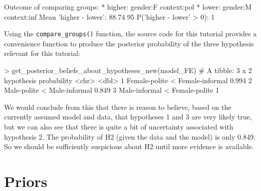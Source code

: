 \documentclass[nobib]{tufte-handout}
\begin{document}
\medskip

\begin{minipage}[]{\textwidth}
\begin{rc}
Outcome of comparing groups:
 * higher:  gender:F context:pol 
 * lower:   gender:M context:inf 
Mean 'higher - lower':  88.74 
95%
P('higher - lower' > 0):  1 
\end{rc}
\end{minipage}

Using the \texttt{compare\_groups()} function, the source code for this tutorial provides a
convenience function to produce the posterior probability of the three hypothesis relevant for
this tutorial:

\medskip

\begin{minipage}[]{\textwidth}
\begin{rc}
> get_posterior_beliefs_about_hypotheses_new(model_FE)
# A tibble: 3 x 2
  hypothesis                      probability
  <chr>                                 <dbl>
1 Female-polite < Female-informal       0.994
2 Male-polite < Male-informal           0.849
3 Male-informal < Female-polite         1
\end{rc}
\end{minipage}

We would conclude from this that there is reason to believe, based on the currently assumed model and data, that hypotheses 1 and 3 are very likely true, but we can also see that there is quite a bit of uncertainty associated with hypothesis 2. The probability of H2 (given the data and the model) is only 0.849. So we should be sufficiently suspicious about H2 until more evidence is available.

%

\section{Priors}
\end{document}
